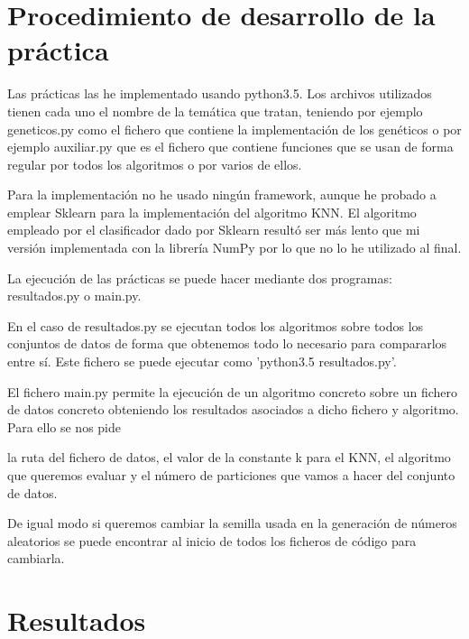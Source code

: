 \documentclass[12pt,a4paper]{article}
\begin{document}
	\newpage

	\section{Procedimiento de desarrollo de la práctica}
	\label{sec:procedimiento}

	Las prácticas las he implementado usando python3.5. Los archivos utilizados tienen cada uno el nombre de la temática que tratan, teniendo por ejemplo geneticos.py como el fichero que contiene la implementación de los genéticos o por ejemplo auxiliar.py que es el fichero que contiene funciones que se usan de forma regular por todos los algoritmos o por varios de ellos.

	Para la implementación no he usado ningún framework, aunque he probado a emplear Sklearn para la implementación del algoritmo KNN. El algoritmo empleado por el clasificador dado por Sklearn resultó ser más lento que mi versión implementada con la librería NumPy por lo que no lo he utilizado al final.

	La ejecución de las prácticas se puede hacer mediante dos programas: resultados.py o main.py.

	En el caso de resultados.py se ejecutan todos los algoritmos sobre todos los conjuntos de datos de forma que obtenemos todo lo necesario para compararlos entre sí. Este fichero se puede ejecutar como 'python3.5 resultados.py'.

	El fichero main.py permite la ejecución de un algoritmo concreto sobre un fichero de datos concreto obteniendo los resultados asociados a dicho fichero y algoritmo. Para ello se nos pide 
	
	 la ruta del fichero de datos, el valor de la constante k para el KNN, el algoritmo que queremos evaluar y el número de particiones que vamos a hacer del conjunto de datos.

	De igual modo si queremos cambiar la semilla usada en la generación de números aleatorios se puede encontrar al inicio de todos los ficheros de código para cambiarla.

	\newpage

	\section{Resultados}
	\label{sec:resultados}
\end{document}
